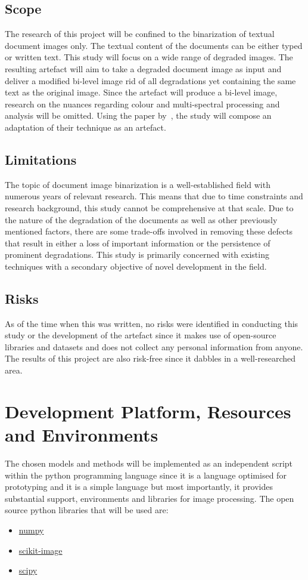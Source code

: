 \documentclass[a4paper, 12pt]{report}
\begin{document}
\subsection{Scope}
The research of this project will be confined to the binarization of textual
document images only. The textual content of the documents can be either typed
or written text. This study will focus on a wide range of degraded images. The
resulting artefact will aim to take a degraded document image as input and
deliver a modified bi-level image rid of all degradations yet containing the
same text as the original image. Since the artefact will produce a bi-level
image, research on the nuances regarding colour and multi-spectral processing
and analysis will be omitted. Using the paper by~\cite{su2012robust}, the study
will compose an adaptation of their technique as an artefact.

\subsection{Limitations}
The topic of document image binarization is a well-established field with
numerous years of relevant research. This means that due to time constraints
and research background, this study cannot be comprehensive at that scale. Due
to the nature of the degradation of the documents as well as other previously
mentioned factors, there are some trade-offs involved in removing these defects
that result in either a loss of important information or the persistence of
prominent degradations. This study is primarily concerned with existing
techniques with a secondary objective of novel development in the field.

\subsection{Risks}
As of the time when this was written, no risks were identified in conducting
this study or the development of the artefact since it makes use of open-source
libraries and datasets and does not collect any personal information from
anyone. The results of this project are also risk-free since it dabbles in a
well-researched area.

\section{Development Platform, Resources and Environments}
The chosen models and methods will be implemented as an independent script
within the python programming language since it is a language optimised for
prototyping and it is a simple language but most importantly, it provides
substantial support, environments and libraries for image processing. The open
source python libraries that will be used are:
\begin{itemize}
    \item \href{https://numpy.org/}{numpy}~\cite{numpy}
    \item \href{https://scikit-image.org/}{scikit-image}~\cite{scikit-image}
    \item \href{https://scikit-image.org/}{scipy}~\cite{2020SciPy-NMeth}
\end{itemize}
\end{document}
